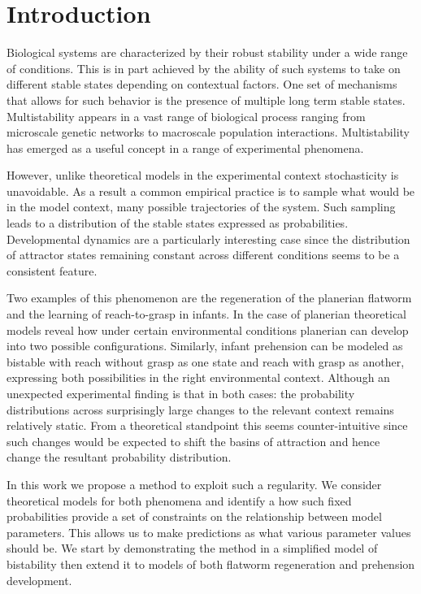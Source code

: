 \documentclass[12pt, a4paper]{article}
\title{}
\author{Denizhan Pak}
\begin{document}
\maketitle
\section{Introduction}
Biological systems are characterized by their robust stability under
a wide range of conditions. This is in part achieved by the ability
of such systems to take on different stable states
depending on contextual factors. One set of mechanisms that allows for such 
behavior is the presence of multiple long term stable states. Multistability
appears in a vast range of biological process ranging from microscale
genetic networks to macroscale population interactions. Multistability has
emerged as a useful concept in a range of experimental phenomena.

However, unlike theoretical models in the experimental context stochasticity
is unavoidable. As a result a common empirical practice is to sample what 
would be in the model context, many possible trajectories of the system. 
Such sampling leads to a distribution of the stable states expressed as 
probabilities. Developmental dynamics are a particularly interesting case 
since the distribution of attractor states remaining constant across 
different conditions seems to be a consistent feature.

Two examples of this phenomenon are the regeneration of the planerian flatworm
and the learning of reach-to-grasp in infants. In the case of planerian
theoretical models reveal how under certain environmental conditions 
planerian can develop into two possible configurations. Similarly, infant
prehension can be modeled as bistable with reach without grasp as one state
and reach with grasp as another, expressing both possibilities in the right
environmental context. Although an unexpected experimental finding is that in
both cases: the probability distributions across surprisingly large changes
to the relevant context remains relatively static. 
From a theoretical standpoint this seems 
counter-intuitive since such changes would be expected to shift the basins
of attraction and hence change the resultant probability distribution.

In this work we propose a method to exploit such a regularity. We consider
theoretical models for both phenomena and identify a how such fixed 
probabilities provide a set of constraints on the relationship between model
parameters. This allows us to make predictions as what various parameter 
values should be. We start by demonstrating the method in a simplified model
of bistability  then extend it to models of both flatworm regeneration and
prehension development.
\end{document}
